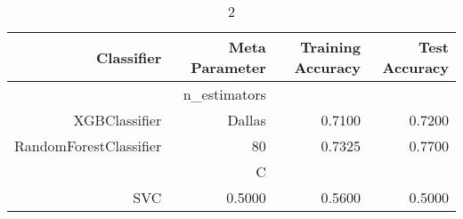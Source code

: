 
\begin{table}[H]
    \caption{2}
    \centering
    \begin{tabular}{|r|r|r|r|}
        \hline
        Classifier &Meta Parameter &Training Accuracy
        &Test Accuracy\\
        \hline
        &n\_estimators &\multicolumn{2}{|r|}{}\\
        \hline
        XGBClassifier &Dallas &0.7100 &0.7200\\
        \hline
        RandomForestClassifier &80 &0.7325 &0.7700\\
        \hline
        &C &\multicolumn{2}{|r|}{}\\
        \hline
        SVC &0.5000 &0.5600 &0.5000\\
        \hline
    \end{tabular}
\end{table}
